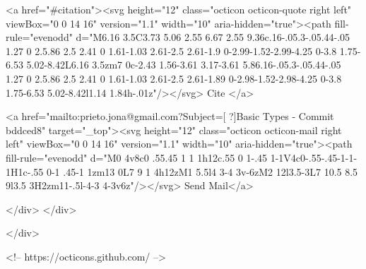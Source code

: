       <a  href="#citation"><svg height="12" class="octicon octicon-quote right left" viewBox="0 0 14 16" version="1.1" width="10" aria-hidden="true"><path fill-rule="evenodd" d="M6.16 3.5C3.73 5.06 2.55 6.67 2.55 9.36c.16-.05.3-.05.44-.05 1.27 0 2.5.86 2.5 2.41 0 1.61-1.03 2.61-2.5 2.61-1.9 0-2.99-1.52-2.99-4.25 0-3.8 1.75-6.53 5.02-8.42L6.16 3.5zm7 0c-2.43 1.56-3.61 3.17-3.61 5.86.16-.05.3-.05.44-.05 1.27 0 2.5.86 2.5 2.41 0 1.61-1.03 2.61-2.5 2.61-1.89 0-2.98-1.52-2.98-4.25 0-3.8 1.75-6.53 5.02-8.42l1.14 1.84h-.01z"/></svg> Cite
      </a>

      <a href="mailto:prieto.jona@gmail.com?Subject=[ ?]Basic Types - Commit bddced8" target="_top"><svg height="12" class="octicon octicon-mail right left" viewBox="0 0 14 16" version="1.1" width="10" aria-hidden="true"><path fill-rule="evenodd" d="M0 4v8c0 .55.45 1 1 1h12c.55 0 1-.45 1-1V4c0-.55-.45-1-1-1H1c-.55 0-1 .45-1 1zm13 0L7 9 1 4h12zM1 5.5l4 3-4 3v-6zM2 12l3.5-3L7 10.5 8.5 9l3.5 3H2zm11-.5l-4-3 4-3v6z"/></svg> Send Mail</a>

    </div>
  </div>

</div>

<!-- https://octicons.github.com/ -->






